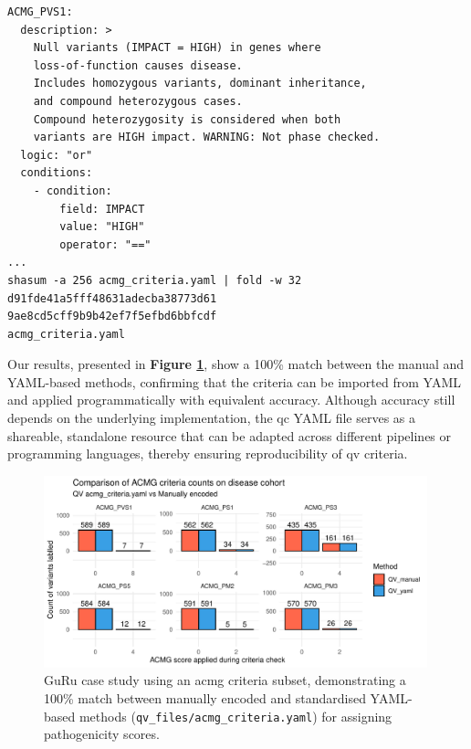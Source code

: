 \begin{tcolorbox}[
    colback=white!0,  %
    colframe=black,  %
    boxrule=1pt,  %
    arc=1mm,  %
    outer arc=1mm,
   title=\textbf{\refstepcounter{myboxcounter}\label{box:acmg_criteria_yaml}Box \themyboxcounter: qv\_files/acmg\_criteria.yaml}
]

\begin{verbatim}
ACMG_PVS1:
  description: >
    Null variants (IMPACT = HIGH) in genes where 
    loss-of-function causes disease.
    Includes homozygous variants, dominant inheritance, 
    and compound heterozygous cases.
    Compound heterozygosity is considered when both 
    variants are HIGH impact. WARNING: Not phase checked.
  logic: "or"
  conditions:
    - condition:
        field: IMPACT
        value: "HIGH"
        operator: "=="
...
shasum -a 256 acmg_criteria.yaml | fold -w 32
d91fde41a5fff48631adecba38773d61
9ae8cd5cff9b9b42ef7f5efbd6bbfcdf
acmg_criteria.yaml
\end{verbatim}
\end{tcolorbox}
\FloatBarrier

Our results, presented in \textbf{Figure \ref{fig:guru_case_study_result}}, show a 100\% match between the manual and YAML-based methods, confirming that the criteria can be imported from YAML and applied programmatically with equivalent accuracy. Although accuracy still depends on the underlying implementation, the \ac{qc} YAML file serves as a shareable, standalone resource that can be adapted across different pipelines or programming languages, thereby ensuring reproducibility of \ac{qv} criteria.

\begin{figure}[!h]
\centering
\includegraphics[width=0.99\textwidth]{./images/Guru_singlecase_validation_of_yaml_vs_manual.pdf}
\caption{GuRu case study using an \ac{acmg} criteria subset, demonstrating a 100\% match between manually encoded and standardised YAML-based methods (\texttt{qv\_files/acmg\_criteria.yaml}) for assigning pathogenicity scores.}
\label{fig:guru_case_study_result}
\end{figure}

